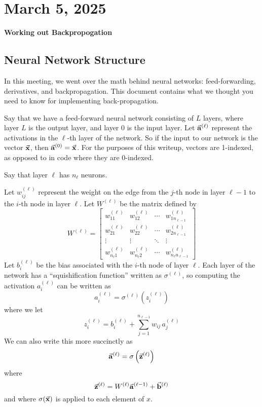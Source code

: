 \section{March 5, 2025}

\begin{center}
    \textbf{Working out Backpropogation}
\end{center}

\subsection{Neural Network Structure}

In this meeting, we went over the math behind neural networks: feed-forwarding,
derivatives, and backpropagation. This document contains what we thought you need to know 
for implementing back-propagation.

Say that we have a feed-forward neural network consisting of $L$ layers, where 
layer $L$ is the output layer, and layer $0$ is the input layer. Let $\vec{\mathbf{a}}^{(\ell)}$ represent the activations 
in the $\ell$-th layer of the network. So if the input to our network is the vector $\vec{\mathbf{x}}$, then $\vec{\mathbf{a}}^{(0)} = \vec{\mathbf{x}}$.
For the purposes of this writeup, vectors are 1-indexed, as opposed to in code where they are 0-indexed.

Say that layer $\ell$ has $n_\ell$ neurons.

Let $w_{ij}^{(\ell)}$ represent the weight on the edge from the $j$-th node in layer $\ell - 1$ to the $i$-th node in layer $\ell$.
Let $W^{(\ell)}$ be the matrix defined by 
\[
    W^{(\ell)} = \left[
        \begin{array}{cccc}
            w_{11}^{(\ell)} & w_{12}^{(\ell)} & \cdots & w_{1n_{\ell - 1}}^{(\ell)} \\
            w_{21}^{(\ell)} & w_{22}^{(\ell)} & \cdots & w_{2n_{\ell - 1}}^{(\ell)} \\
            \vdots          & \vdots          & \ddots & \vdots \\
            w_{n_\ell 1}^{(\ell)} & w_{n_\ell 2}^{(\ell)} & \cdots & w_{n_\ell n_{\ell - 1}}^{(\ell)}
        \end{array}
    \right]
\]
Let $b_i^{(\ell)}$ be the bias associated with the $i$-th node of layer $\ell$.
Each layer of the network has a ``squishification function'' written as $\sigma^{(\ell)}$, so computing the activation $a_i^{(\ell)}$ can 
be written as 
\[
    a_i^{(\ell)} = \sigma^{(\ell)} \left(
        z_i^{(\ell)}
    \right) 
\]
where we let 
\[
    z_i^{(\ell)} = b_i^{(\ell)} + \sum_{j = 1}^{n_{\ell - 1}} w_{ij} \, a_j^{(\ell)}
\]
We can also write this more succinctly as  
\[
    \vec{\mathbf{a}}^{(\ell)} = \sigma\left( \vec{\mathbf{z}}^{(\ell)} \right)
\]
where \[
    \vec{\mathbf{z}}^{(\ell)} = W^{(\ell)} \vec{\mathbf{a}}^{(\ell - 1)} + \vec{\mathbf{b}}^{(\ell)}
\]
and where $\sigma(\vec{\mathbf{x}})$ is applied to each element of $x$.

